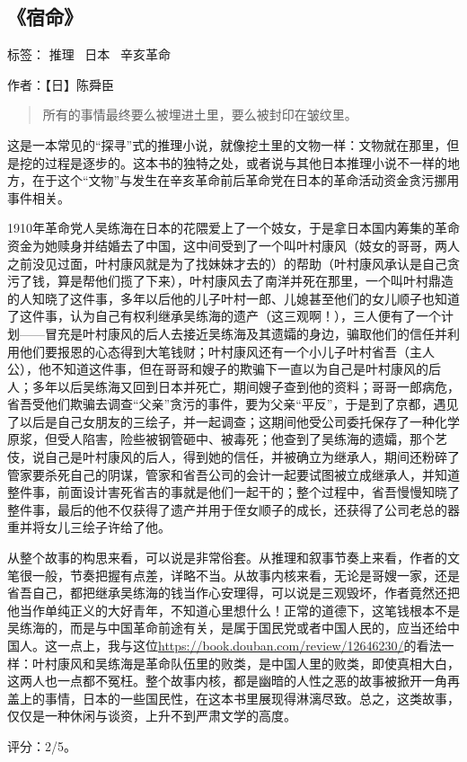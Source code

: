 \subsection{《宿命》}

标签： 推理 \ 日本 \ 辛亥革命

作者：【日】陈舜臣

\begin{quotation}
所有的事情最终要么被埋进土里，要么被封印在皱纹里。
\end{quotation}

这是一本常见的“探寻”式的推理小说，就像挖土里的文物一样：文物就在那里，但是挖的过程是逐步的。这本书的独特之处，或者说与其他日本推理小说不一样的地方，在于这个“文物”与发生在辛亥革命前后革命党在日本的革命活动资金贪污挪用事件相关。

1910年革命党人吴练海在日本的花隈爱上了一个妓女，于是拿日本国内筹集的革命资金为她赎身并结婚去了中国，这中间受到了一个叫叶村康风（妓女的哥哥，两人之前没见过面，叶村康风就是为了找妹妹才去的）的帮助（叶村康风承认是自己贪污了钱，算是帮他们揽了下来），叶村康风去了南洋并死在那里，一个叫叶村鼎造的人知晓了这件事，多年以后他的儿子叶村一郎、儿媳甚至他们的女儿顺子也知道了这件事，认为自己有权利继承吴练海的遗产（这三观啊！），三人便有了一个计划——冒充是叶村康风的后人去接近吴练海及其遗孀的身边，骗取他们的信任并利用他们要报恩的心态得到大笔钱财；叶村康风还有一个小儿子叶村省吾（主人公），他不知道这件事，但在哥哥和嫂子的欺骗下一直以为自己是叶村康风的后人；多年以后吴练海又回到日本并死亡，期间嫂子查到他的资料；哥哥一郎病危，省吾受他们欺骗去调查“父亲”贪污的事件，要为父亲“平反”，于是到了京都，遇见了以后是自己女朋友的三绘子，并一起调查；这期间他受公司委托保存了一种化学原浆，但受人陷害，险些被钢管砸中、被毒死；他查到了吴练海的遗孀，那个艺伎，说自己是叶村康风的后人，得到她的信任，并被确立为继承人，期间还粉碎了管家要杀死自己的阴谋，管家和省吾公司的会计一起要试图被立成继承人，并知道整件事，前面设计害死省吉的事就是他们一起干的；整个过程中，省吾慢慢知晓了整件事，最后的他不仅获得了遗产并用于侄女顺子的成长，还获得了公司老总的器重并将女儿三绘子许给了他。

从整个故事的构思来看，可以说是非常俗套。从推理和叙事节奏上来看，作者的文笔很一般，节奏把握有点差，详略不当。从故事内核来看，无论是哥嫂一家，还是省吾自己，都把继承吴练海的钱当作心安理得，可以说是三观毁坏，作者竟然还把他当作单纯正义的大好青年，不知道心里想什么！正常的道德下，这笔钱根本不是吴练海的，而是与中国革命前途有关，是属于国民党或者中国人民的，应当还给中国人。这一点上，我与这位\url{https://book.douban.com/review/12646230/}的看法一样：叶村康风和吴练海是革命队伍里的败类，是中国人里的败类，即使真相大白，这两人也一点都不冤枉。整个故事内核，都是幽暗的人性之恶的故事被掀开一角再盖上的事情，日本的一些国民性，在这本书里展现得淋漓尽致。总之，这类故事，仅仅是一种休闲与谈资，上升不到严肃文学的高度。

评分：2/5。